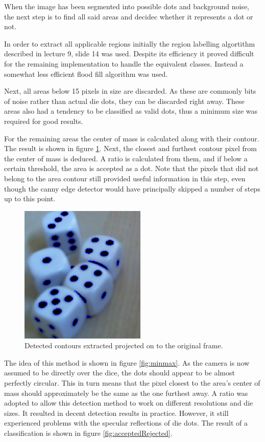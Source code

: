 When the image has been segmented into possible dots and background noise, the next step is to find all said areas and decidec whether it represents a dot or not. 

In order to extract all applicable regions initially the region labelling algortithm described in lecture 9, slide 14 was used. Despite its efficiency it proved difficult for the remaining implementation to handle the equivalent classes. Instead a somewhat less efficient flood fill algorithm was used. 

Next, all areas below 15 pixels in size are discarded. As these are commonly bits of noise rather than actual die dots, they can be discarded right away. These areas also had a tendency to be classified as valid dots, thus a minimum size was required for good results.

For the remaining areas the center of mass is calculated along with their contour. The result is shown in figure \ref{fig:contour}. Next, the closest and furthest contour pixel from the center of mass is deduced. A ratio is calculated from them, and if below a certain threshold, the area is accepted as a dot. Note that the pixels that did not belong to the area contour still provided useful information in this step, even though the canny edge detector would have principally skipped a number of steps up to this point.

\begin{figure}
	\centering
	\includegraphics[width=60mm]{images/dies/contour.png}
	\caption{Detected contours extracted projected on to the original frame.}
	\label{fig:contour}
\end{figure}

The idea of this method is shown in figure \ref{fig:minmax}. As the camera is now assumed to be directly over the dice, the dots should appear to be almost perfectly circular. This in turn means that the pixel closest to the area's center of mass should approximately be the same as the one furthest away. A ratio was adopted to allow this detection method to work on different resolutions and die sizes. It resulted in decent detection results in practice. However, it still experienced problems with the specular reflections of die dots. The result of a classification is shown in figure \ref{fig:acceptedRejected}.

